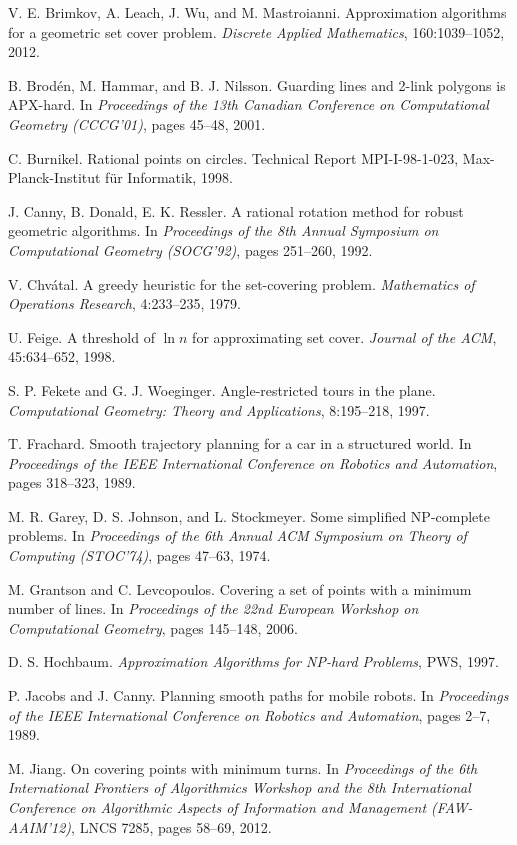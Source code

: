 \documentclass[letterpaper,11pt]{article}
\begin{document}
\begin{thebibliography}{99}
V. E. Brimkov, A. Leach, J. Wu, and M. Mastroianni.
Approximation algorithms for a geometric set cover problem.
\emph{Discrete Applied Mathematics},
160:1039--1052, 2012.

B. Brod\'en, M. Hammar, and B. J. Nilsson.
Guarding lines and 2-link polygons is APX-hard.
In \emph{Proceedings of the 13th Canadian Conference on Computational
  Geometry (CCCG'01)}, 
pages 45--48, 2001.

C. Burnikel.
Rational points on circles.
Technical Report MPI-I-98-1-023,
Max-Planck-Institut f{\"u}r Informatik,
1998.

J. Canny, B. Donald, E. K. Ressler.
A rational rotation method for robust geometric algorithms.
In
\emph{Proceedings of the 8th Annual Symposium on Computational Geometry (SOCG'92)},
pages 251--260, 1992.

V. Chv\'atal.
A greedy heuristic for the set-covering problem.
\emph{Mathematics of Operations Research},
4:233--235, 1979.

U. Feige.
A threshold of $\ln n$ for approximating set cover.
\emph{Journal of the ACM},
45:634--652, 1998.

S. P. Fekete and G. J. Woeginger.
Angle-restricted tours in the plane.
\emph{Computational Geometry: Theory and Applications},
8:195--218, 1997.

T. Frachard.
Smooth trajectory planning for a car in a structured world.
In \emph{Proceedings of the IEEE International Conference on Robotics
  and Automation}, 
pages 318--323, 1989.

M. R. Garey, D. S. Johnson, and L. Stockmeyer.
Some simplified NP-complete problems.
In \emph{Proceedings of the 6th Annual ACM Symposium on Theory of
  Computing (STOC'74)}, 
pages 47--63, 1974.

M. Grantson and C. Levcopoulos.
Covering a set of points with a minimum number of lines.
In \emph{Proceedings of the 22nd European Workshop on Computational Geometry},
pages 145--148, 2006.

D. S. Hochbaum.
\emph{Approximation Algorithms for NP-hard Problems},
PWS, 1997.

P. Jacobs and J. Canny.
Planning smooth paths for mobile robots.
In \emph{Proceedings of the IEEE International Conference on Robotics and Automation},
pages 2--7, 1989.

M. Jiang.
On covering points with minimum turns.
In \emph{Proceedings of the 6th International Frontiers of Algorithmics
  Workshop and the 8th International Conference on Algorithmic Aspects
  of Information and Management (FAW-AAIM'12)}, 
LNCS 7285, pages 58--69, 2012.


\end{thebibliography}
\end{document}
